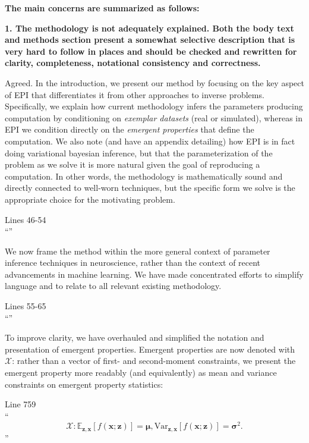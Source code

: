 \documentclass[11pt,a4paper]{article}
\begin{document}
\textbf{The main concerns are summarized as follows:}

\textbf{1. The methodology is not adequately explained. Both the body text and methods section present a somewhat selective description that is very hard to follow in places and should be checked and rewritten for clarity, completeness, notational consistency and correctness.}

Agreed.
In the introduction, we present our method by focusing on the key aspect of EPI that differentiates it from other approaches to inverse problems.
Specifically, we explain how current methodology infers the parameters producing computation by conditioning on \textit{exemplar datasets} (real or simulated), whereas in EPI we condition directly on the \textit{emergent properties} that define the computation.  We also note (and have an appendix detailing) how EPI is in fact doing variational bayesian inference, but that the parameterization of the problem as we solve it is more natural given the goal of reproducing a computation.  In other words, the methodology is mathematically sound and directly connected to well-worn techniques, but the specific form we solve is the appropriate choice for the motivating problem.

\begin{displayquote}
Lines 46-54\\
``''
\end{displayquote}

We now frame the method within the more general context of parameter inference techniques in neuroscience, rather than the context of recent advancements in machine learning.
We have made concentrated efforts to simplify language and to relate to all relevant existing methodology.

\begin{displayquote}
Lines 55-65\\
``''
\end{displayquote}

To improve clarity, we have overhauled and simplified the notation and presentation of emergent properties.
Emergent properties are now denoted with $\mathcal{X}$: rather than a vector of first- and second-moment constraints, we present the emergent property more readably (and equivalently) as mean and variance constraints on emergent property statistics:

\begin{displayquote}
Line 759 \\
``
\begin{equation} \tag{11}
\mathcal{X}: \mathbb{E}_{\mathbf{z},\mathbf{x}}\left[f(\mathbf{x}; \mathbf{z})\right] = \bm{\mu}, \text{Var}_{\mathbf{z},\mathbf{x}}\left[f(\mathbf{x}; \mathbf{z})\right] = \bm{\sigma}^2.
\end{equation}''
\end{displayquote}
\end{document}
